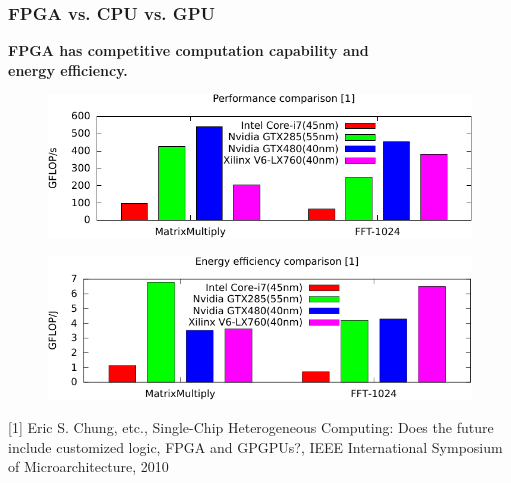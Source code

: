 \documentclass{beamer}
\begin{document}
\begin{frame}[t]
\frametitle{FPGA vs. CPU vs. GPU}

\vspace{-1em}
\textbf{FPGA has competitive computation capability and \\
        energy efficiency.} 

\begin{figure}
  \vspace{-1em}
  \includegraphics[width=.8\linewidth]{performance-cpu-fpga-gpu}
  \vspace{-1em}
\end{figure}
\begin{figure}
  \vspace{-1em}
  \includegraphics[width=.8\linewidth]{energy-cpu-fpga-gpu}
  \vspace{-1em}
\end{figure}

\begin{spacing}{1.2}
\tiny{[1] Eric S. Chung, etc., Single-Chip Heterogeneous Computing: Does the future include customized
logic, FPGA and GPGPUs?, IEEE International Symposium of Microarchitecture, 2010}
\end{spacing}

\end{frame}

\end{document}
